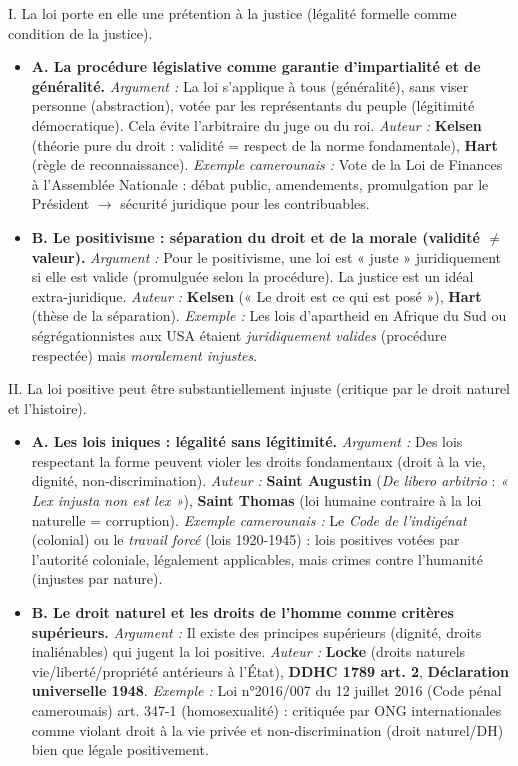 \documentclass[11pt]{article}
\newcommand{\cle}[1]{{\popxbold\color{popdark}#1}}
\begin{document}
\begin{corrige}
\begin{enumerate}
\cle{I. La loi porte en elle une prétention à la justice (légalité formelle comme condition de la justice).}
\begin{itemize}
\item \textbf{A. La procédure législative comme garantie d'impartialité et de généralité.}
      \textit{Argument :} La loi s'applique à tous (généralité), sans viser personne (abstraction), votée par les représentants du peuple (légitimité démocratique). Cela évite l'arbitraire du juge ou du roi. \textit{Auteur :} \textbf{Kelsen} (théorie pure du droit : validité = respect de la norme fondamentale), \textbf{Hart} (règle de reconnaissance). \textit{Exemple camerounais :} Vote de la Loi de Finances à l'Assemblée Nationale : débat public, amendements, promulgation par le Président $\to$ sécurité juridique pour les contribuables.
\item \textbf{B. Le positivisme : séparation du droit et de la morale (validité $\neq$ valeur).}
      \textit{Argument :} Pour le positivisme, une loi est « juste » juridiquement si elle est valide (promulguée selon la procédure). La justice est un idéal extra-juridique. \textit{Auteur :} \textbf{Kelsen} (« Le droit est ce qui est posé »), \textbf{Hart} (thèse de la séparation). \textit{Exemple :} Les lois d'apartheid en Afrique du Sud ou ségrégationnistes aux USA étaient \emph{juridiquement valides} (procédure respectée) mais \emph{moralement injustes}.
\end{itemize}

\cle{II. La loi positive peut être substantiellement injuste (critique par le droit naturel et l'histoire).}
\begin{itemize}
\item \textbf{A. Les lois iniques : légalité sans légitimité.}
      \textit{Argument :} Des lois respectant la forme peuvent violer les droits fondamentaux (droit à la vie, dignité, non-discrimination). \textit{Auteur :} \textbf{Saint Augustin} (\emph{De libero arbitrio} : \emph{« Lex injusta non est lex »}), \textbf{Saint Thomas} (loi humaine contraire à la loi naturelle = corruption). \textit{Exemple camerounais :} Le \emph{Code de l'indigénat} (colonial) ou le \emph{travail forcé} (lois 1920-1945) : lois positives votées par l'autorité coloniale, légalement applicables, mais crimes contre l'humanité (injustes par nature).
\item \textbf{B. Le droit naturel et les droits de l'homme comme critères supérieurs.}
      \textit{Argument :} Il existe des principes supérieurs (dignité, droits inaliénables) qui jugent la loi positive. \textit{Auteur :} \textbf{Locke} (droits naturels vie/liberté/propriété antérieurs à l'État), \textbf{DDHC 1789 art. 2}, \textbf{Déclaration universelle 1948}. \textit{Exemple :} Loi n°2016/007 du 12 juillet 2016 (Code pénal camerounais) art. 347-1 (homosexualité) : critiquée par ONG internationales comme violant droit à la vie privée et non-discrimination (droit naturel/DH) bien que légale positivement.
\end{itemize}


\end{enumerate}
\end{corrige}
\end{document}

